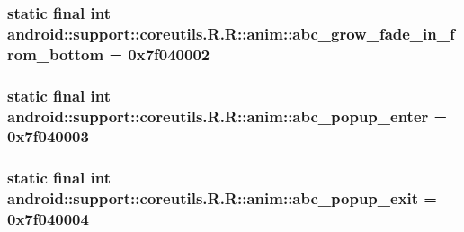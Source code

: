\hypertarget{classandroid_1_1support_1_1coreutils_1_1_r_1_1anim_3c48b130a672cd838244a9d54845a70b}{
\subsubsection[{abc\_\-grow\_\-fade\_\-in\_\-from\_\-bottom}]{\setlength{\rightskip}{0pt plus 5cm}static final int android::support::coreutils.R.R::anim::abc\_\-grow\_\-fade\_\-in\_\-from\_\-bottom = 0x7f040002}}
\label{classandroid_1_1support_1_1coreutils_1_1_r_1_1anim_3c48b130a672cd838244a9d54845a70b}


\hypertarget{classandroid_1_1support_1_1coreutils_1_1_r_1_1anim_a6a36145bf6919ba28d64063a220b549}{
\subsubsection[{abc\_\-popup\_\-enter}]{\setlength{\rightskip}{0pt plus 5cm}static final int android::support::coreutils.R.R::anim::abc\_\-popup\_\-enter = 0x7f040003}}
\label{classandroid_1_1support_1_1coreutils_1_1_r_1_1anim_a6a36145bf6919ba28d64063a220b549}


\hypertarget{classandroid_1_1support_1_1coreutils_1_1_r_1_1anim_f9044545dade5538252994411c5a9369}{
\subsubsection[{abc\_\-popup\_\-exit}]{\setlength{\rightskip}{0pt plus 5cm}static final int android::support::coreutils.R.R::anim::abc\_\-popup\_\-exit = 0x7f040004}}
\label{classandroid_1_1support_1_1coreutils_1_1_r_1_1anim_f9044545dade5538252994411c5a9369}


